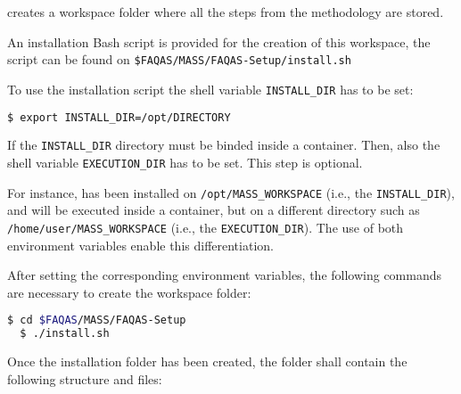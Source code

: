 \MASS creates a workspace folder where all the steps from the methodology are stored. 

An installation Bash script is provided for the creation of this workspace, the script can be found on \texttt{\$FAQAS/MASS/FAQAS-Setup/install.sh}

To use the installation script the shell variable \texttt{INSTALL\_DIR} has to be set:

\begin{lstlisting}[language=bash]
  $ export INSTALL_DIR=/opt/DIRECTORY
\end{lstlisting}

If the \texttt{INSTALL\_DIR} directory must be binded inside a container. Then, also the shell variable \texttt{EXECUTION\_DIR} has to be set. This step is optional.

For instance, \MASS has been installed on \texttt{/opt/MASS\_WORKSPACE} (i.e., the \texttt{INSTALL\_DIR}), and \MASS will be executed inside a container, but on a different directory such as \\\texttt{/home/user/MASS\_WORKSPACE} (i.e., the \texttt{EXECUTION\_DIR}). The use of both environment variables enable this differentiation.


After setting the corresponding environment variables, the following commands are necessary to create the \MASS workspace folder:

\begin{lstlisting}[language=bash]
  $ cd $FAQAS/MASS/FAQAS-Setup
  $ ./install.sh
\end{lstlisting}

Once the installation folder has been created, the folder shall contain the following structure and files:

